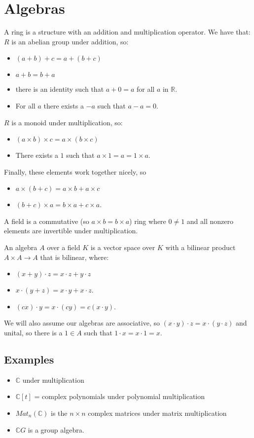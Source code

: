 \documentclass[]{report}
\theoremstyle{definition}
\numberwithin{theorem}{section}
\numberwithin{equation}{section}
\begin{document}
\section{Algebras}
A ring is a structure with an addition and multiplication operator. We have that:
$R$ is an abelian group under addition, so:
\begin{itemize}
	\item $(a + b) + c = a + (b + c)$
	\item $a + b = b + a$
	\item there is an identity such that $a + 0 = a$ for all $a$ in $\mathbb{R}$.
	\item For all $a$ there exists a $-a$ such that $a - a = 0$. 
\end{itemize}
$R$ is a monoid under multiplication, so:
\begin{itemize}
	\item $(a \times b) \times c = a \times (b \times c)$
	\item There exists a $1$ such that $a \times 1 = a = 1 \times a$.
\end{itemize}
Finally, these elements work together nicely, so
\begin{itemize}
	\item $a \times (b + c) = a \times b + a \times c$
	\item $(b + c) \times a = b \times a + c \times a$. 
\end{itemize}

A field is a commutative (so $a \times b = b \times a$) ring where $0 \neq 1$ and all nonzero elements are invertible under multiplication.

An algebra $A$ over a field $K$ is a vector space over $K$ with a bilinear product $A \times A \rightarrow A$ that is bilinear, where:
\begin{itemize}
	\item $(x + y) \cdot z = x \cdot z + y \cdot z$
	\item $x  \cdot (y + z) = x \cdot y + x \cdot z$.
	\item $(cx) \cdot y = x \cdot (cy) = c (x \cdot y)$.
\end{itemize}
We will also assume our algebras are associative, so $(x \cdot y) \cdot z = x \cdot (y \cdot z)$ and unital, so there is a $1 \in A$ such that $1 \cdot x = x \cdot 1 = x$.

\subsection{Examples}
\begin{itemize}
	\item $\mathbb{C}$ under multiplication
	\item $\mathbb{C}[t]$ = complex polynomials under polynomial multiplication
	\item $Mat_n(\mathbb{C})$ is the $n \times n$ complex matrices under matrix multiplication
	\item $\mathbb{C} G$ is a group algebra.
\end{itemize}
\end{document}
